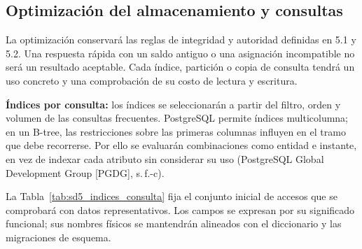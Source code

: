 \subsection{Optimización del almacenamiento y consultas}
\label{subsec:sd5_optimizacion}

La optimización conservará las reglas de integridad y autoridad definidas en 5.1 y 5.2. Una respuesta rápida con un saldo antiguo o una asignación incompatible no será un resultado aceptable. Cada índice, partición o copia de consulta tendrá un uso concreto y una comprobación de su costo de lectura y escritura.

\textbf{Índices por consulta:} los índices se seleccionarán a partir del filtro, orden y volumen de las consultas frecuentes. PostgreSQL permite índices multicolumna; en un B-tree, las restricciones sobre las primeras columnas influyen en el tramo que debe recorrerse. Por ello se evaluarán combinaciones como entidad e instante, en vez de indexar cada atributo sin considerar su uso (PostgreSQL Global Development Group [PGDG], s.\,f.-c).

La Tabla~\ref{tab:sd5_indices_consulta} fija el conjunto inicial de accesos que se comprobará con datos representativos. Los campos se expresan por su significado funcional; sus nombres físicos se mantendrán alineados con el diccionario y las migraciones de esquema.

